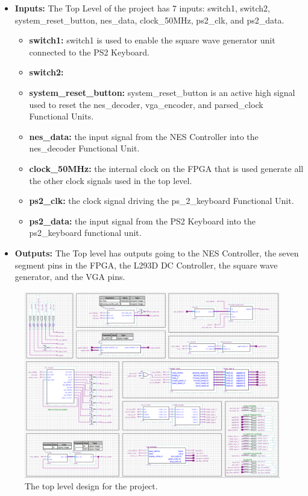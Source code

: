 \documentclass[a4paper]{article}
\begin{document}
\begin{itemize}
  \item \textbf{Inputs:  } The Top Level of the project has 7 inputs: switch1, switch2, system\_reset\_button, nes\_data, clock\_50MHz, ps2\_clk, and ps2\_data.
    \begin{itemize}
      \item \textbf{switch1: } switch1 is used to enable the square wave generator unit connected to the PS2 Keyboard.
      \item \textbf{switch2: }
      \item \textbf{system\_reset\_button: } system\_reset\_button is an active high signal used to reset the nes\_decoder, vga\_encoder, and parsed\_clock Functional Units.
      \item \textbf{nes\_data: } the input signal from the NES Controller into the nes\_decoder Functional Unit.
      \item \textbf{clock\_50MHz: } the internal clock on the FPGA that is used generate all the other clock signals used in the top level.
      \item \textbf{ps2\_clk: } the clock signal driving the ps\_2\_keyboard Functional Unit.
      \item \textbf{ps2\_data: } the input signal from the PS2 Keyboard into the ps2\_keyboard functional unit.
    \end{itemize}
  \item \textbf{Outputs: } The Top level has outputs going to the NES Controller, the seven segment pins in the FPGA, the L293D DC Controller, the square wave generator, and the VGA pins.
\end{itemize}

\begin{figure}[h]
  \centering
    \includegraphics[width=.98\textwidth]{images/top_level.png}
	\caption{The top level design for the  project.}
    \label{fig:top-level}
\end{figure}
\end{document}
